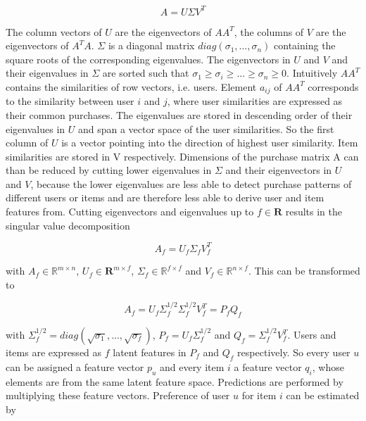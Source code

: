 \documentclass[10pt]{reportMaster}
\begin{document}
\begin{equation}
	A = U \Sigma V^T
\end{equation}

The column vectors of $U$ are the eigenvectors of $AA^T$, the columns of $V$ are the eigenvectors of $A^TA$.
$\Sigma$ is a diagonal matrix $diag(\sigma_1, ..., \sigma_n)$ containing the square roots of the corresponding eigenvalues.  %
The eigenvectors in $U$ and $V$ and their eigenvalues in $\Sigma$ are sorted such that $\sigma_1 \geq \sigma_i \geq ... \geq \sigma_n \geq 0$.
Intuitively $AA^T$ contains the similarities of row vectors, i.e. users.
Element $a_{ij}$ of $AA^T$ corresponds to the similarity between user $i$ and $j$, where user similarities are expressed as their common purchases.
The eigenvalues are stored in descending order of their eigenvalues in $U$ and span a vector space of the user similarities.
So the first column of $U$ is a vector pointing into the direction of highest user similarity. %
Item similarities are stored in V respectively.
Dimensions of the purchase matrix A can than be reduced by cutting lower eigenvalues in $\Sigma$ and their eigenvectors in $U$ and $V$, because the lower eigenvalues are less able to detect purchase patterns of different users or items and are therefore less able to derive user and item features from.
Cutting eigenvectors and eigenvalues up to $f \in \mathbf{R}$ results in the singular value decomposition 

\begin{equation}
	A_f = U_f \Sigma_f V_f^T
\end{equation}

with $A_f \in \mathds{R}^{m \times n}$, $U_f \in \mathbf{R}^{m \times f}$, $\Sigma_f \in \mathds{R}^{f \times f}$ and $V_f \in \mathds{R}^{n \times f}$.
This can be transformed to 

\begin{equation}
	A_f = U_f \Sigma_f^{1/2} \Sigma_f^{1/2} V_f^T = P_f Q_f
\end{equation}

with $\Sigma_f^{1/2} = diag(\sqrt{\sigma_1}, ..., \sqrt{\sigma_f})$, $P_f = U_f \Sigma_f^{1/2}$ and $Q_f = \Sigma_f^{1/2} V_f^T$.
Users and items are expressed as $f$ latent features in $P_f$ and $Q_f$ respectively.
So every user $u$ can be assigned a feature vector $p_u$ and every item $i$ a feature vector $q_i$, whose elements are from the same latent feature space.
Predictions are performed by multiplying these feature vectors.
Preference of user $u$ for item $i$ can be estimated by 
\end{document}
